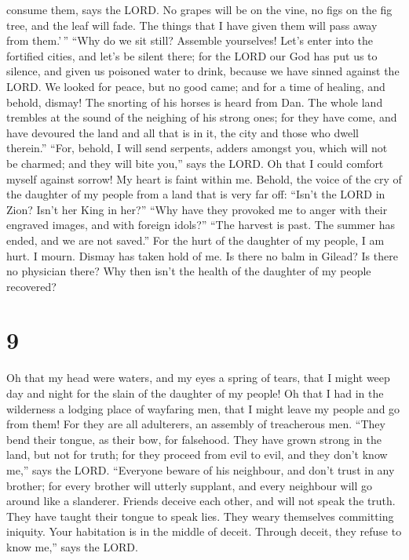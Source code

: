 consume them, says the LORD. No grapes will be on the vine, no figs on
the fig tree, and the leaf will fade. The things that I have given them
will pass away from them.'\,''  ``Why do we sit still?
Assemble yourselves! Let's enter into the fortified cities, and let's be
silent there; for the LORD our God has put us to silence, and given us
poisoned water to drink, because we have sinned against the LORD.
 We looked for peace, but no good came; and for a time of
healing, and behold, dismay!  The snorting of his horses
is heard from Dan. The whole land trembles at the sound of the neighing
of his strong ones; for they have come, and have devoured the land and
all that is in it, the city and those who dwell therein.''
 ``For, behold, I will send serpents, adders amongst you,
which will not be charmed; and they will bite you,'' says the LORD.
 Oh that I could comfort myself against sorrow! My heart
is faint within me.  Behold, the voice of the cry of the
daughter of my people from a land that is very far off: ``Isn't the LORD
in Zion? Isn't her King in her?'' ``Why have they provoked me to anger
with their engraved images, and with foreign idols?'' 
``The harvest is past. The summer has ended, and we are not saved.''
 For the hurt of the daughter of my people, I am hurt. I
mourn. Dismay has taken hold of me.  Is there no balm in
Gilead? Is there no physician there? Why then isn't the health of the
daughter of my people recovered?

\hypertarget{section-8}{%
\section{9}\label{section-8}}

 Oh that my head were waters, and my eyes a spring of
tears, that I might weep day and night for the slain of the daughter of
my people!  Oh that I had in the wilderness a lodging
place of wayfaring men, that I might leave my people and go from them!
For they are all adulterers, an assembly of treacherous men.
 ``They bend their tongue, as their bow, for falsehood.
They have grown strong in the land, but not for truth; for they proceed
from evil to evil, and they don't know me,'' says the LORD.
 ``Everyone beware of his neighbour, and don't trust in
any brother; for every brother will utterly supplant, and every
neighbour will go around like a slanderer.  Friends
deceive each other, and will not speak the truth. They have taught their
tongue to speak lies. They weary themselves committing iniquity.
 Your habitation is in the middle of deceit. Through
deceit, they refuse to know me,'' says the LORD.

